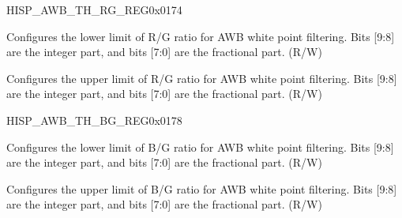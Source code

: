 \begin{register}{H}{ISP\_AWB\_TH\_RG\_REG}{0x0174}\label{regdesc:ISPAWBTHRGREG}
%
%
%
%
\regnewline%
\begin{regdesc}\begin{reglist}
\label{fielddesc:ISPAWBMINRG}\item [ISP\_AWB\_MIN\_RG] Configures the lower limit of R/G ratio for AWB white point filtering. Bits [9:8] are the integer part, and bits [7:0] are the fractional part. (R/W)
\label{fielddesc:ISPAWBMAXRG}\item [ISP\_AWB\_MAX\_RG] Configures the upper limit of R/G ratio for AWB white point filtering. Bits [9:8] are the integer part, and bits [7:0] are the fractional part. (R/W)
\end{reglist}\end{regdesc}
\end{register}


\begin{register}{H}{ISP\_AWB\_TH\_BG\_REG}{0x0178}\label{regdesc:ISPAWBTHBGREG}
%
%
%
%
\regnewline%
\begin{regdesc}\begin{reglist}
\label{fielddesc:ISPAWBMINBG}\item [ISP\_AWB\_MIN\_BG] Configures the lower limit of B/G ratio for AWB white point filtering. Bits [9:8] are the integer part, and bits [7:0] are the fractional part. (R/W)
\label{fielddesc:ISPAWBMAXBG}\item [ISP\_AWB\_MAX\_BG] Configures the upper limit of B/G ratio for AWB white point filtering. Bits [9:8] are the integer part, and bits [7:0] are the fractional part. (R/W)
\end{reglist}\end{regdesc}
\end{register}


